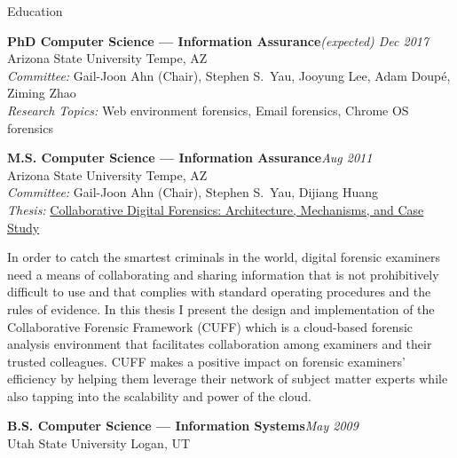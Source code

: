 

\begin{rSection}{Education}

\textbf{PhD Computer Science --- Information Assurance}\hfill \emph{(expected) Dec 2017}\\
Arizona State University \hfill {Tempe, AZ}\\
\textit{Committee:} Gail-Joon Ahn (Chair), Stephen S.\ Yau, Jooyung Lee, Adam Doup\'{e}, Ziming Zhao\\
\textit{Research Topics:} Web environment forensics, Email forensics, Chrome OS forensics

\textbf{M.S. Computer Science --- Information Assurance}\hfill \emph{Aug 2011}\\
Arizona State University \hfill {Tempe, AZ}\\
\textit{Committee:} Gail-Joon Ahn (Chair), Stephen S.\ Yau, Dijiang Huang\\
\textit{Thesis:} \href{http://repository.asu.edu/attachments/56996/content/Mabey_asu_0010N_10959.pdf}{Collaborative Digital Forensics: Architecture, Mechanisms, and Case Study}\begin{CVonly}
\begin{quoting}
  In order to catch the smartest criminals in the world, digital forensic examiners need a means of collaborating and sharing information that is not prohibitively difficult to use and that complies with standard operating procedures and the rules of evidence. In this thesis I present the design and implementation of the Collaborative Forensic Framework (CUFF) which is a cloud-based forensic analysis environment that facilitates collaboration among examiners and their trusted colleagues. CUFF makes a positive impact on forensic examiners' efficiency by helping them leverage their network of subject matter experts while also tapping into the scalability and power of the cloud.
\end{quoting}\end{CVonly}

\textbf{B.S. Computer Science --- Information Systems}\hfill \emph{May 2009}\\
Utah State University \hfill {Logan, UT}

\end{rSection}
